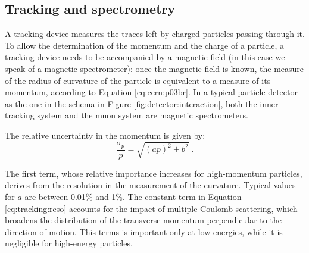 \subsection{Tracking and spectrometry}
\label{sec:dec:tracking}
A tracking device measures the traces left by charged particles passing through it. To allow the determination of the momentum and the charge of a particle, a tracking device needs to be accompanied by a magnetic field (in this case we speak of a magnetic spectrometer): once the magnetic field is known, the measure of the radius of curvature of the particle is equivalent to a measure of its momentum, according to Equation \ref{eq:cern:p03br}. In a typical particle detector as the one in the schema in Figure \ref{fig:detector:interaction}, both the inner tracking system and the muon system are magnetic spectrometers.

The relative uncertainty in the momentum is given by:
\begin{equation}
\frac{\sigma_p}{p} = \sqrt{ \left(a p \right)^2 + b^2} \; .
\label{eq:tracking:reso}
\end{equation}

The first term, whose relative importance increases for high-momentum particles, derives from the resolution in the measurement of the curvature. Typical values for $a$ are between 0.01\% and 1\%. The constant term in Equation \ref{eq:tracking:reso} accounts for the impact of multiple Coulomb scattering, which broadens the distribution of the transverse momentum perpendicular to the direction of motion. This terms is important only at low energies, while it is negligible for high-energy particles.

